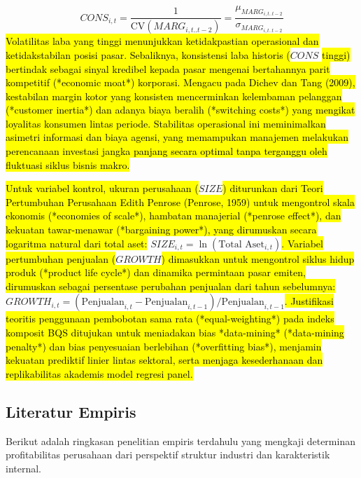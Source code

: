 \documentclass[12pt,a4paper]{article}
\begin{document}
\begin{enumerate}
{  }$$CONS_{i,t} = \frac{1}{\text{CV}(MARG_{i,t..t-2})} = \frac{\mu_{MARG_{i,t..t-2}}}{\sigma_{MARG_{i,t..t-2}}}$$\hl{
  Volatilitas laba yang tinggi menunjukkan ketidakpastian operasional dan ketidakstabilan posisi pasar. Sebaliknya, konsistensi laba historis (}$CONS$\hl{ tinggi) bertindak sebagai sinyal kredibel kepada pasar mengenai bertahannya parit kompetitif (*economic moat*) korporasi. Mengacu pada Dichev dan Tang (2009), kestabilan margin kotor yang konsisten mencerminkan kelembaman pelanggan (*customer inertia*) dan adanya biaya beralih (*switching costs*) yang mengikat loyalitas konsumen lintas periode. Stabilitas operasional ini meminimalkan asimetri informasi dan biaya agensi, yang memampukan manajemen melakukan perencanaan investasi jangka panjang secara optimal tanpa terganggu oleh fluktuasi siklus bisnis makro.}
\end{enumerate}

\hl{Untuk variabel kontrol, ukuran perusahaan (}$SIZE$\hl{) diturunkan dari Teori Pertumbuhan Perusahaan Edith Penrose (Penrose, 1959) untuk mengontrol skala ekonomis (*economies of scale*), hambatan manajerial (*penrose effect*), dan kekuatan tawar-menawar (*bargaining power*), yang dirumuskan secara logaritma natural dari total aset: }$SIZE_{i,t} = \ln(\text{Total Aset}_{i,t})$\hl{. Variabel pertumbuhan penjualan (}$GROWTH$\hl{) dimasukkan untuk mengontrol siklus hidup produk (*product life cycle*) dan dinamika permintaan pasar emiten, dirumuskan sebagai persentase perubahan penjualan dari tahun sebelumnya: }$GROWTH_{i,t} = (\text{Penjualan}_{i,t} - \text{Penjualan}_{i,t-1}) / \text{Penjualan}_{i,t-1}$\hl{. Justifikasi teoritis penggunaan pembobotan sama rata (*equal-weighting*) pada indeks komposit BQS ditujukan untuk meniadakan bias *data-mining* (*data-mining penalty*) dan bias penyesuaian berlebihan (*overfitting bias*), menjamin kekuatan prediktif linier lintas sektoral, serta menjaga kesederhanaan dan replikabilitas akademis model regresi panel.}

\subsection{Literatur Empiris}\label{literatur-empiris}

Berikut adalah ringkasan penelitian empiris terdahulu yang mengkaji
determinan profitabilitas perusahaan dari perspektif struktur industri
dan karakteristik internal.
\end{document}
